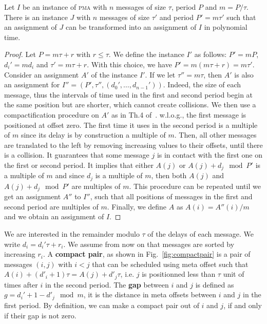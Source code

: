 \documentclass[a4paper,UKenglish,cleveref, autoref, thm-restate]{lipics-v2019}
\newcommand\pma{\textsc{pma}\xspace}
\begin{document}
\begin{lemma}\label{lemma:multiple}
Let $I$ be an instance of \pma with $n$ messages of size $\tau$, period $P$ and $m = P / \tau$. There is an instance $J$ with $n$ messages of size $\tau'$ and period $P'= m\tau'$ such that an assignment of $J$ can be transformed into an assignment of $I$ in polynomial time.
\end{lemma}
\begin{proof}
Let $P = m \tau + r$ with $r \leq \tau$. We define the instance $I'$ as follows: $P' = mP$, $d_{i}' = m d_i$ and $\tau' = m \tau + r$. With this choice, we have $P' = m(m \tau + r) = m \tau'$.
Consider an assignment $A'$ of the instance $I'$.
If we let $\tau'' = m\tau$, then $A'$ is also an assignment for $I'' = (P',\tau'',(d_{0}',\dots,d_{n-1}'))$. Indeed, the size of each message, thus the intervals of time used in the first and second period begin at the same position but are shorter, which cannot create collisions. We then use a compactification procedure on $A'$ as in Th.4 of~\cite{dominique2018deterministic}. w.l.o.g., the first message is positioned at offset zero. The first time it uses in the second period is a multiple of $m$ since its delay is by construction a multiple of $m$. Then, all other messages are translated to the left by removing increasing values to their offsets, until there is a collision. It guarantees that some message $j$ is in contact with the first one on the first or second period. It implies that either $A(j)$ or $A(j)+d_j \mod P'$ is a multiple of $m$ and since $d_j$ is a multiple of $m$, then both $A(j)$ and $A(j)+d_j \mod P'$ are multiples of $m$. This procedure can be repeated until we get an assignment $A''$ to $I''$, such that all positions of messages in the first and second period are multiples of $m$. Finally, we define $A$ as $A(i) = A''(i)/m$ and we obtain an assignment of $I$.
\end{proof}


We are interested in the remainder modulo $\tau$ of the delays of each message.
We write $d_i = d_{i}'\tau + r_i$. We assume from now on that messages are sorted by increasing $r_i$.
A \textbf{compact pair}, as shown in Fig.~\ref{fig:compactpair} is a pair of messages $(i,j)$ with $i < j$ that can be scheduled using meta offset such that $A(i) + (d'_i+1)\tau = A(j) + d'_j\tau$, i.e. $j$ is positionned less than $\tau$ unit of times after $i$ in the second period.
The \textbf{gap} between $i$ and $j$ is defined as  $g = d_{i}' + 1 - d'_{j} \mod m$, it is the distance in meta offsets between $i$ and $j$ in the first period. By definition, we can make a compact pair out of $i$ and $j$, if and only if their gap is not zero.
\end{document}
